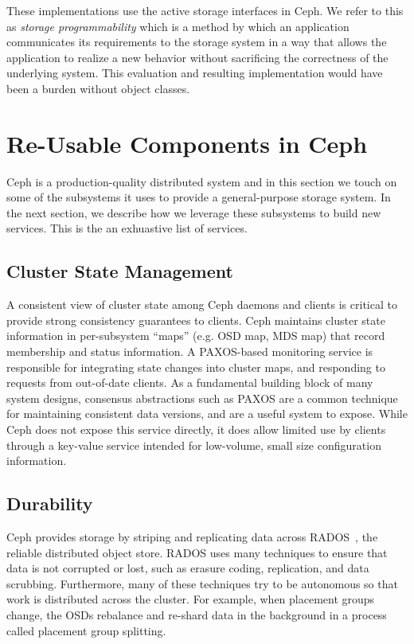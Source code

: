 \documentclass[10pt,twocolumn]{article}
\begin{document}
These implementations use the active storage interfaces in Ceph. We
refer to this as \emph{storage programmability} which is a method by
which an application communicates its requirements to the storage system
in a way that allows the application to realize a new behavior without
sacrificing the correctness of the underlying system. This evaluation
and resulting implementation would have been a burden without object
classes.
\fi

\section{Re-Usable Components in Ceph}\label{re-usable-components-in-ceph}

\label{background}

Ceph is a production-quality distributed system and in this section we
touch on some of the subsystems it uses to provide a general-purpose
storage system. In the next section, we describe how we leverage these
subsystems to build new services. This is the an exhuastive list of services.

\subsection{Cluster State Management}
\label{consistencyversioning-of-cluster-state}

A consistent view of cluster state among Ceph daemons and clients is critical
to provide strong consistency guarantees to clients.  Ceph maintains cluster
state information in per-subsystem ``maps'' (e.g. OSD map, MDS map) that
record membership and status information. A PAXOS-based monitoring service is
responsible for integrating state changes into cluster maps, and responding to
requests from out-of-date clients.  As a fundamental building block of many
system designs, consensus abstractions such as PAXOS are a common technique
for maintaining consistent data versions, and are a useful system to expose.
While Ceph does not expose this service directly, it does allow limited use by
clients through a key-value service intended for low-volume, small size
configuration information.

\subsection{Durability}
\label{sec:durability}

Ceph provides storage by striping and replicating data across
RADOS~\cite{weil_rados_2007}, the reliable distributed object store. RADOS
uses many techniques to ensure that data is not corrupted or lost, such as
erasure coding, replication, and data scrubbing. Furthermore, many of these
techniques try to be autonomous so that work is distributed across the
cluster. For example, when placement groups change, the OSDs rebalance and
re-shard data in the background in a process called placement group splitting.
\end{document}

